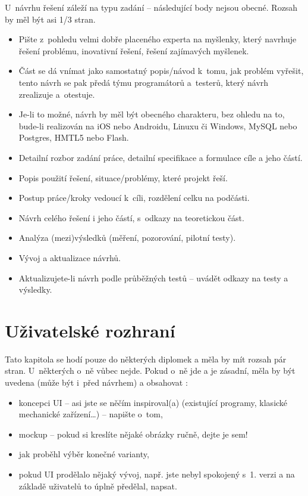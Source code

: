 U~návrhu řešení záleží na typu zadání -- následující body nejsou obecné. Rozsah by měl být asi 1/3 stran.
\begin{itemize}
  \item{Pište z~pohledu velmi dobře placeného experta na myšlenky, který navrhuje řešení problému, inovativní řešení, řešení zajímavých myšlenek.}
  \item{Část  se dá vnímat jako samostatný popis/návod k~tomu, jak problém vyřešit, tento návrh se pak předá týmu programátorů a~testerů, který návrh zrealizuje a~otestuje.}
  \item{Je-li to možné, návrh by měl být obecného charakteru, bez ohledu na to, bude-li realizován na iOS nebo Androidu, Linuxu či Windows, MySQL nebo Postgres, HMTL5 nebo Flash.}
  \item{Detailní rozbor zadání práce, detailní specifikace a formulace cíle a jeho částí.}
  \item{Popis použití řešení, situace/problémy, které projekt řeší.}
  \item{Postup práce/kroky vedoucí k~cíli, rozdělení celku na podčásti.}
  \item{Návrh celého řešení i jeho částí, s~odkazy na teoretickou část.}
  \item{Analýza (mezi)výsledků (měření, pozorování, pilotní testy).}
  \item{Vývoj a aktualizace návrhů.}
  \item{Aktualizujete-li návrh podle průběžných testů -- uvádět odkazy na testy a výsledky.}
\end{itemize}

\section{Uživatelské rozhraní}

Tato kapitola se hodí pouze do některých diplomek a měla by mít rozsah pár stran. U~některých o~ně vůbec nejde. Pokud o~ně jde a je zásadní, měla by být uvedena (může být i~před návrhem) a obsahovat \cite{Cernocky}:
\begin{itemize}
  \item{koncepci UI -- asi jste se něčím inspiroval(a) (existující programy, klasické mechanické zařízení\ldots) -- napište o~tom,}
  \item{mockup -- pokud si kreslíte nějaké obrázky ručně, dejte je sem!}
  \item{jak proběhl výběr konečné varianty,}
  \item{pokud UI prodělalo nějaký vývoj, např. jste nebyl spokojený s~1. verzi a na základě uživatelů to úplně předělal, napsat.}
\end{itemize}



